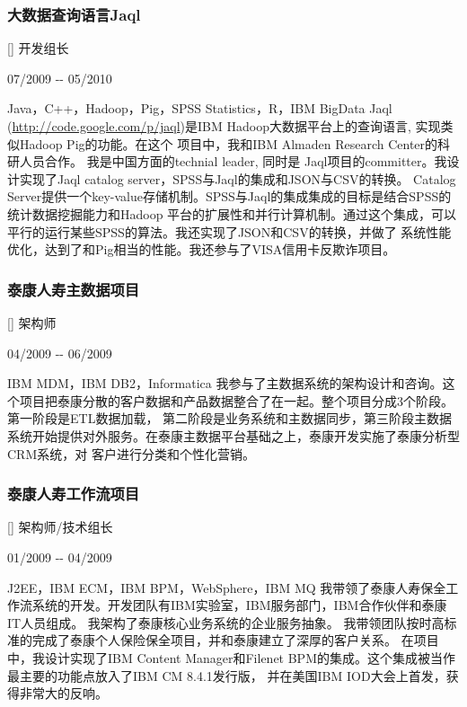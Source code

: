 \documentclass[a4paper]{article}
\newenvironment{DUlineblock}[1]{%
    \list{}{\setlength{\partopsep}{\parskip}
            \addtolength{\partopsep}{\baselineskip}
            \setlength{\topsep}{0pt}
            \setlength{\itemsep}{0.15\baselineskip}
            \setlength{\parsep}{0pt}
            \setlength{\leftmargin}{#1}}
    \raggedright
  }
  {\endlist}
\begin{document}
\begin{CJK}{UTF8}{gkai}
\subsubsection*{大数据查询语言Jaql}
\begin{DUlineblock}{0em}
\item[] 开发组长
\item[] 07/2009 -{}- 05/2010
\item[] Java，C++，Hadoop，Pig，SPSS Statistics，R，IBM BigData
\end{DUlineblock}
Jaql (\url{http://code.google.com/p/jaql})是IBM Hadoop大数据平台上的查询语言, 实现类似Hadoop Pig的功能。在这个
项目中，我和IBM Almaden Research Center的科研人员合作。 我是中国方面的technial leader, 同时是
Jaql项目的committer。我设计实现了Jaql catalog server，SPSS与Jaql的集成和JSON与CSV的转换。
Catalog Server提供一个key-value存储机制。SPSS与Jaql的集成集成的目标是结合SPSS的统计数据挖掘能力和Hadoop
平台的扩展性和并行计算机制。通过这个集成，可以平行的运行某些SPSS的算法。我还实现了JSON和CSV的转换，并做了
系统性能优化，达到了和Pig相当的性能。我还参与了VISA信用卡反欺诈项目。

\subsubsection*{泰康人寿主数据项目}
\begin{DUlineblock}{0em}
\item[] 架构师
\item[] 04/2009 -{}- 06/2009
\item[] IBM MDM，IBM DB2，Informatica
\end{DUlineblock}
我参与了主数据系统的架构设计和咨询。这个项目把泰康分散的客户数据和产品数据整合了在一起。整个项目分成3个阶段。第一阶段是ETL数据加载，
第二阶段是业务系统和主数据同步，第三阶段主数据系统开始提供对外服务。在泰康主数据平台基础之上，泰康开发实施了泰康分析型CRM系统，对
客户进行分类和个性化营销。

\subsubsection*{泰康人寿工作流项目}
\begin{DUlineblock}{0em}
\item[] 架构师/技术组长
\item[] 01/2009 -{}- 04/2009
\item[] J2EE，IBM ECM，IBM BPM，WebSphere，IBM MQ
\end{DUlineblock}
我带领了泰康人寿保全工作流系统的开发。开发团队有IBM实验室，IBM服务部门，IBM合作伙伴和泰康IT人员组成。
我架构了泰康核心业务系统的企业服务抽象。
我带领团队按时高标准的完成了泰康个人保险保全项目，并和泰康建立了深厚的客户关系。
在项目中，我设计实现了IBM Content Manager和Filenet BPM的集成。这个集成被当作最主要的功能点放入了IBM CM 8.4.1发行版，
并在美国IBM IOD大会上首发，获得非常大的反响。


\end{CJK}
\end{document}
